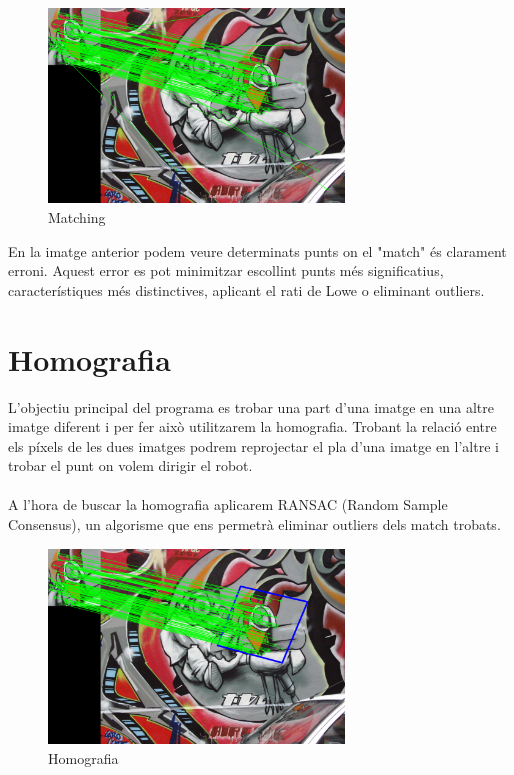	\begin{figure}[H]
		\centering
		\includegraphics[width=0.7\textwidth]{images/matching}
		\caption{Matching}
	\end{figure}

	En la imatge anterior podem veure determinats punts on el "match" és clarament erroni. Aquest error es pot minimitzar escollint punts més significatius, característiques més distinctives, aplicant el rati
	de Lowe o eliminant outliers.

\newpage
\section{Homografia}

	L'objectiu principal del programa es trobar una part d'una imatge en una altre imatge diferent i per fer això utilitzarem la homografia. Trobant la relació entre els píxels de les dues imatges podrem
	reprojectar el pla d'una imatge en l'altre i trobar el punt on volem dirigir el robot.\\\\
	A l'hora de buscar la homografia aplicarem RANSAC (Random Sample Consensus), un algorisme que ens permetrà eliminar outliers dels match trobats.\\

	\begin{figure}[H]
		\centering
		\includegraphics[width=0.7\textwidth]{images/homography}
		\caption{Homografia}
	\end{figure}
